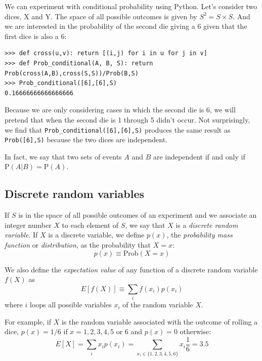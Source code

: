 \documentclass[justified,sixbynine]{tufte-book}
\def\ft{\small\tt}
\theoremstyle{plain}%
\theoremstyle{definition}
\theoremstyle{remark}
\begin{document}
\begin{fullwidth}
We can experiment with conditional probability using Python. Let's consider two dices, X and Y.
The space of all possible outcomes is given by $S^2 = S \times S$.
And we are interested in the probability of the second die giving a $6$ given that the first dice is also a $6$:

\begin{lstlisting}[caption={in file: {\ft nlib.py}}]
>>> def cross(u,v): return [(i,j) for i in u for j in v]
>>> def Prob_conditional(A, B, S): return Prob(cross(A,B),cross(S,S))/Prob(B,S)
>>> Prob_conditional([6],[6],S)
0.16666666666666666
\end{lstlisting}

Because we are only considering cases in which the second die is 6, we will pretend that when the second die is 1 through 5 didn't occur.
Not surprisingly, we find that {\ft Prob\_conditional([6],[6],S)} produces the same result as
{\ft Prob([6],S)} because the two dices are independent.

In fact, we say that two sets of events $A$ and $B$ are independent if and only if $\textrm{P}(A|B) = \textrm{P}(A)$.


\goodbreak\subsection{Discrete random variables}

If $S$ is in the space of all possible outcomes of an experiment and we
associate an integer number $X$ to each element of $S$, we say that $X$ is a
{\it discrete random variable}. If $X$ is a discrete variable, we define $%
p(x)$, the {\it probability mass function} or {\it distribution}, as the
probability that $X=x$:
\begin{equation}
p(x) \equiv \textrm{Prob}(X=x)
\end{equation}

We also define the {\it expectation value} of any function of a discrete
random variable $f(X)$ as
\begin{equation}
E[f(X)] \equiv  \sum_i f(x_i)p(x_i)
\end{equation}
where $i$ loops all possible variables $x_i$ of the random variable $X$.

For example, if $X$ is the random variable associated with the outcome of rolling a dice, $p(x)=1/6$ if $x=1,2,3,4,5$ or $6$ and $p(x)=0$ otherwise:
\begin{equation}
E[X]=\sum_ix_ip(x_i)=\sum_{x_i\in \{1,2,3,4,5,6\}}x_i\frac 16=3.5
\end{equation}


\end{fullwidth}
\end{document}
